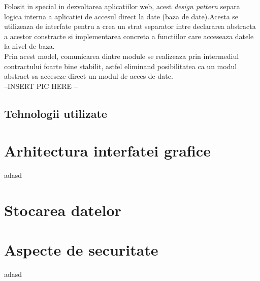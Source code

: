 Folosit in special in dezvoltarea aplicatiilor web, acest \textit{design pattern} separa logica interna a aplicatiei de accesul direct la date (baza de date).Acesta se utilizeaza de interfate pentru a crea un strat separator intre declararea abstracta a acestor constracte si implementarea concreta a functiilor care acceseaza datele la nivel de baza.\\
Prin acest model, comunicarea dintre module se realizeaza prin intermediul contractului foarte bine stabilit, astfel eliminand posibilitatea ca un modul abstract sa acceseze direct un modul de acces de date.\\

--INSERT PIC HERE --\\

\subsection*{Tehnologii utilizate}


\section{Arhitectura interfatei grafice}

adasd
\section{Stocarea datelor}

\section{Aspecte de securitate}

adasd
